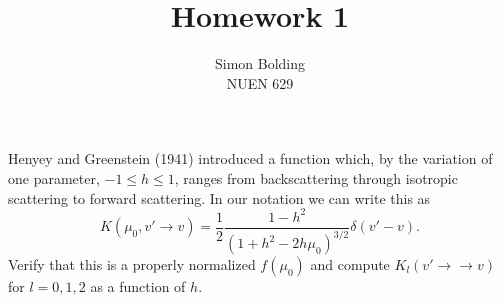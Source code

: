 \documentclass[12pt]{article}
\newenvironment{problem}[2][Problem]{\begin{trivlist}
\item[\hskip \labelsep {\bfseries #1}\hskip \labelsep {\bfseries #2:}]\hspace{0.3in}\newline\newline}{\end{trivlist}}
\newenvironment{solution}[1][Solution]{\begin{trivlist}
\item[\hskip \labelsep {\bfseries #1} {\hspace{-0.2em}\bfseries:}]\hspace{0.3in}\newline}{\end{trivlist}}
\begin{document}
 
 
\title{Homework 1}%
\author{Simon Bolding\\ %
NUEN 629} %
 
\maketitle

\clearpage

%

\begin{problem}{1}
Henyey and Greenstein (1941) introduced a function which, by the variation of one
parameter, $−1 \leq h \leq 1$, ranges from backscattering through isotropic scattering to forward scattering. In
our notation we can write this as
\begin{equation}
    K( \mu_0 , v'\rightarrow v) = \frac{1}{2}
    \frac{1-h^2}{\left(1+h^2-2h\mu_0\right)^{3/2}}\delta(v'-v).
\end{equation}
Verify that this is a properly normalized $f ( \mu_0 )$ and compute $K_l (v'
\rightarrow → v)$ for $l = 0, 1, 2$ as a function of $h$.

\end{problem}

\begin{solution}

\end{solution}
\clearpage
\end{document}
